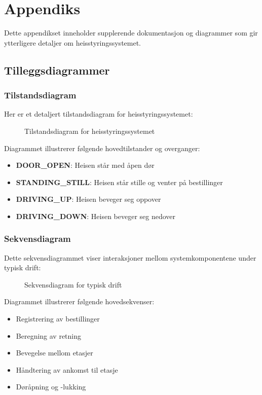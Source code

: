 \appendix
\chapter{Appendiks}
Dette appendikset inneholder supplerende dokumentasjon og diagrammer som gir ytterligere detaljer om heisstyringssystemet.



\section{Tilleggsdiagrammer}
\subsection{Tilstandsdiagram}
Her er et detaljert tilstandsdiagram for heisstyringssystemet:

\begin{figure}[H]
    \centering
    \caption{Tilstandsdiagram for heisstyringssystemet}
    \label{fig:state_diagram}
\end{figure}

Diagrammet illustrerer følgende hovedtilstander og overganger:
\begin{itemize}
    \item \textbf{DOOR\_OPEN}: Heisen står med åpen dør
    \item \textbf{STANDING\_STILL}: Heisen står stille og venter på bestillinger
    \item \textbf{DRIVING\_UP}: Heisen beveger seg oppover
    \item \textbf{DRIVING\_DOWN}: Heisen beveger seg nedover
\end{itemize}

\subsection{Sekvensdiagram}
Dette sekvensdiagrammet viser interaksjoner mellom systemkomponentene under typisk drift:

\begin{figure}[H]
    \centering
    \caption{Sekvensdiagram for typisk drift}
    \label{fig:sequence_diagram}
\end{figure}

Diagrammet illustrerer følgende hovedsekvenser:
\begin{itemize}
    \item Registrering av bestillinger
    \item Beregning av retning
    \item Bevegelse mellom etasjer
    \item Håndtering av ankomst til etasje
    \item Døråpning og -lukking
\end{itemize}